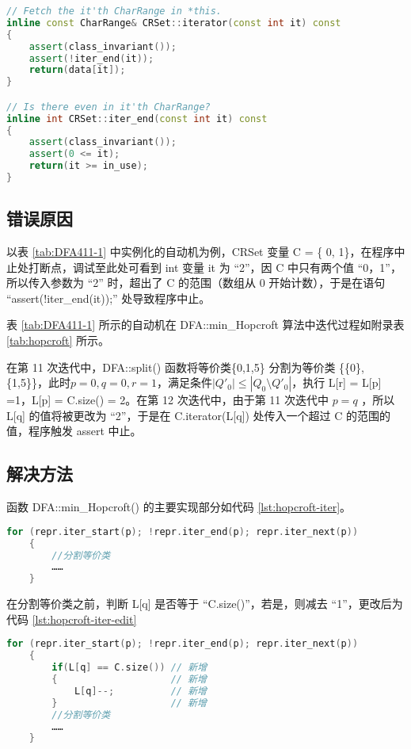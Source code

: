 \begin{lstlisting}[language=C++,label={lst:iterend},caption={ CRSet.h },firstnumber=142]
// Fetch the it'th CharRange in *this.
inline const CharRange& CRSet::iterator(const int it) const
{
    assert(class_invariant());
    assert(!iter_end(it));
    return(data[it]);
}

// Is there even in it'th CharRange?
inline int CRSet::iter_end(const int it) const
{
    assert(class_invariant());
    assert(0 <= it);
    return(it >= in_use);
}
\end{lstlisting}

\subsection{错误原因}

以表 \ref{tab:DFA411-1} 中实例化的自动机为例，CRSet 变量 C = \{ 0, 1\}，在程序中止处打断点，调试至此处可看到 int 变量 it 为 “2”，因 C 中只有两个值 “0，1”，所以传入参数为 “2” 时，超出了 C 的范围（数组从 0 开始计数），于是在语句 “assert(!iter\_end(it));” 处导致程序中止。

表 \ref{tab:DFA411-1} 所示的自动机在 DFA::min\_Hopcroft 算法中迭代过程如附录表 \ref{tab:hopcroft} 所示。

在第 11 次迭代中，DFA::split() 函数将等价类\{0,1,5\} 分割为等价类 \{\{0\},\{1,5\}\}，此时$p=0,q=0,r=1$，满足条件$|Q'_0| \leq | Q_0 \setminus Q'_0 |$，执行 L[r] = L[p] =1，L[p] = C.size() = 2。在第 12 次迭代中，由于第 11 次迭代中 $p=q$ ，所以 L[q] 的值将被更改为 “2”，于是在 C.iterator(L[q]) 处传入一个超过 C 的范围的值，程序触发 assert 中止。

\subsection{解决方法}

函数 DFA::min\_Hopcroft() 的主要实现部分如代码 \ref{lst:hopcroft-iter}。

\begin{lstlisting}[language=C++,label={lst:hopcroft-iter},caption={ min-hop.cpp },firstnumber=100]
    for (repr.iter_start(p); !repr.iter_end(p); repr.iter_next(p))
    {
        //分割等价类
        ……
    }
\end{lstlisting}

在分割等价类之前，判断 L[q] 是否等于 “C.size()”，若是，则减去 “1”，更改后为代码 \ref{lst:hopcroft-iter-edit}


\begin{lstlisting}[language=C++,label={lst:hopcroft-iter-edit},caption={ min-hop.cpp },firstnumber=100]
    for (repr.iter_start(p); !repr.iter_end(p); repr.iter_next(p))
    {
        if(L[q] == C.size()) // 新增
        {                    // 新增
            L[q]--;          // 新增
        }                    // 新增
        //分割等价类
        ……
    }
\end{lstlisting}

